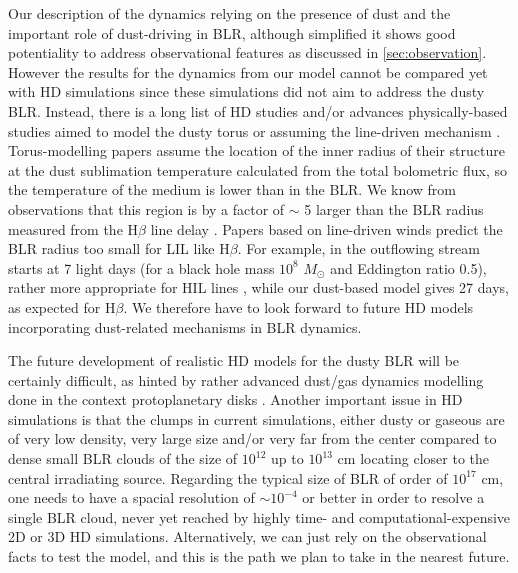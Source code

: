 \documentclass[twocolumn]{aastex62}
\begin{document}
Our description of the dynamics relying on the presence of dust and the important role of dust-driving in BLR, although simplified it shows good potentiality to address observational features as discussed in \ref{sec:observation}. However the results for the dynamics from our model cannot be compared yet with HD simulations since these simulations did not aim to address the dusty BLR. Instead, there is a long list of HD studies and/or advances physically-based studies aimed to model the dusty torus \citep[e.g.][]{Konigl1994, dorodnitsyn2012, wada2012, chan2016, chan2017, williamson2019, hoenig2019, Huang2020} or assuming the line-driven mechanism \citep[e.g.][]{murray1995, proga2000, higginbottom2014, waters2016, WatersProga2016, waters2021}. Torus-modelling papers assume the location of the inner radius of their structure at the dust sublimation temperature calculated from the total bolometric flux, so the temperature of the medium is lower than in the BLR. We know from observations that this region is by a factor of $\sim$ 5 larger than the BLR radius measured from the H$\beta$ line delay \citep{Koshida2014}. Papers based on line-driven winds predict the BLR radius too small for LIL like H$\beta$. For example, in \citet{proga2000} the outflowing stream starts at 7 light days (for a black hole mass $10^8$ $M_{\odot}$ and Eddington ratio 0.5), rather more appropriate for HIL lines \citep[also see ][]{WatersProga2016}, while our dust-based model gives 27 days, as expected for H$\beta$. We therefore have to look forward to future HD models incorporating dust-related mechanisms in BLR dynamics.

The future development of realistic HD models for the dusty BLR will be certainly difficult, as hinted by rather advanced dust/gas dynamics modelling done in the context protoplanetary disks \citep[see e.g.][]{vinkovi2021}. Another important issue in HD simulations is that the clumps in current simulations, either dusty or gaseous are of very low density, very large size and/or very far from the center \citep[e.g.][]{waters2021} compared to dense small BLR clouds of the size of $10^{12}$ up to $10^{13}$ cm \citep[e.g.][]{risaliti2011, pietrini2019} locating closer to the central irradiating source. Regarding the typical size of BLR of order of $10^{17}$ cm, one needs to have a spacial resolution of $\sim 10^{-4}$ or better in order to resolve a single BLR cloud, never yet reached by highly time- and computational-expensive 2D or 3D HD simulations. Alternatively,  we can just rely on the observational facts to test the model, and this is the path we plan to take in the nearest future.
\end{document}
